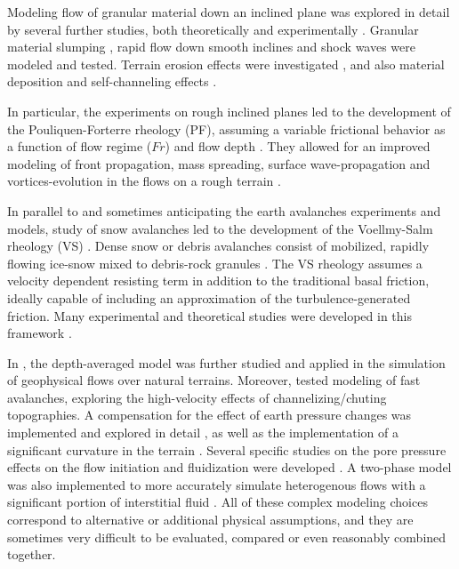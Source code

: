 \documentclass{article}
\begin{document}
Modeling flow of granular material down an inclined plane was explored in detail by several further studies, both theoretically and experimentally \citep{Pouliquen1999, RuyerQuil2000, Silbert2001, Bursik2005, DaCruz2005}. Granular material slumping \citep{Balmforth2005,Lajeunesse2005}, rapid flow down smooth inclines \citep{Greve1994,Wieland1999} and shock waves \citep{Gray2003,Hokanardottir2005} were modeled and tested. Terrain erosion effects were investigated \citep{Pitman2003b, Edwards2015}, and also material deposition and self-channeling effects \citep{Mangeney2005, Mangeney2007}.

In particular, the experiments on rough inclined planes led to the development of the Pouliquen-Forterre rheology (PF), assuming a variable frictional behavior as a function of flow regime ($Fr$) and flow depth \citep{Pouliquen1999, ForterrePouliquen2002, PouliquenForterre2002, ForterrePouliquen2003}. They allowed for an improved modeling of front propagation, mass spreading, surface wave-propagation and vortices-evolution in the flows on a rough terrain \citep{Forterre2006, Jop2006, ForterrePouliquen2008}.

In parallel to and sometimes anticipating the earth avalanches experiments and models, study of snow avalanches led to the development of the Voellmy-Salm rheology (VS) \citep{Voellmy1955, Salm1990, Salm1993, Bartelt1999}. Dense snow or debris avalanches consist of mobilized, rapidly flowing ice-snow mixed to debris-rock granules \citep{BarteltMcArdell2009}. The VS rheology assumes a velocity dependent resisting term in addition to the traditional basal friction, ideally capable of including an approximation of the turbulence-generated friction. Many experimental and theoretical studies were developed in this framework \citep{Gruber2007, Kern2009, Christen2010, Fischer2012}.

In \cite{Iverson1997, Iverson2001, Denlinger2001, Denlinger2004, Iverson2004}, the depth-averaged model was further studied and applied in the simulation of geophysical flows over natural terrains. Moreover, \cite{Gray1999, Gray2003} tested modeling of fast avalanches, exploring the high-velocity effects of channelizing/chuting topographies. A compensation for the effect of earth pressure changes was implemented and explored in detail \citep{Pirulli2007,Pirulli2008}, as well as the implementation of a significant curvature in the terrain \citep{PudasainiHutter2003, Fischer2012}. Several specific studies on the pore pressure effects on the flow initiation and fluidization were developed \citep{SavageIverson2003, Iordanoff2004, Iverson2014}. A two-phase model was also implemented to more accurately simulate heterogenous flows with a significant portion of interstitial fluid \citep{PitmanLe2005}. All of these complex modeling choices correspond to alternative or additional physical assumptions, and they are sometimes very difficult to be evaluated, compared or even reasonably combined together.
\end{document}
